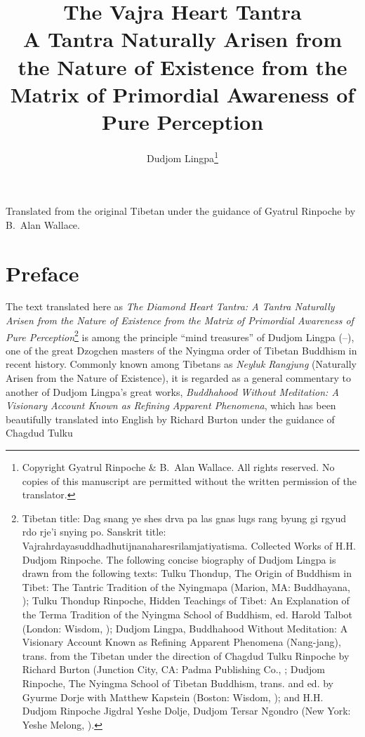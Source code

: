\documentclass[a4paper,11pt,twoside,final]{book}
\title{{\Huge The Vajra Heart Tantra}\\
A Tantra Naturally Arisen from the Nature of Existence
from the Matrix of Primordial Awareness of Pure Perception}
\author{\Large Dudjom Lingpa\footnote{Copyright Gyatrul Rinpoche \&
    B.~Alan Wallace. All rights reserved. No copies of this manuscript
    are permitted without the written permission of the translator.}}
\date{}
\begin{document}
\maketitle

\begin{center}
  Translated from the original Tibetan under the guidance of Gyatrul
  Rinpoche by B.~Alan Wallace.
\end{center}

\chapter{Preface}

The text translated here as \emph{The Diamond Heart Tantra: A Tantra
  Naturally Arisen from the Nature of Existence from the Matrix of
  Primordial Awareness of Pure Perception}\footnote{Tibetan title: Dag
  snang ye shes drva pa las gnas lugs rang byung gi rgyud rdo rje'i
  snying po. Sanskrit title:
  Vajrahrdayasuddhadhutijnanaharesrilamjatiyatisma. Collected Works of
  H.H. Dudjom Rinpoche. The following concise biography of Dudjom
  Lingpa is drawn from the following texts: Tulku Thondup, The Origin
  of Buddhism in Tibet: The Tantric Tradition of the Nyingmapa
  (Marion, MA: Buddhayana, ); Tulku Thondup
  Rinpoche, Hidden Teachings of Tibet: An Explanation of the Terma
  Tradition of the Nyingma School of Buddhism, ed. Harold Talbot
  (London: Wisdom, ); Dudjom Lingpa, Buddhahood
  Without Meditation: A Visionary Account Known as Refining Apparent
  Phenomena (Nang-jang), trans. from the Tibetan under the direction
  of Chagdud Tulku Rinpoche by Richard Burton (Junction City, CA:
  Padma Publishing Co., ; Dudjom Rinpoche, The
  Nyingma School of Tibetan Buddhism, trans. and ed. by Gyurme Dorje
  with Matthew Kapstein (Boston: Wisdom, ); and
  H.H. Dudjom Rinpoche Jigdral Yeshe Dolje, Dudjom Tersar Ngondro (New
  York: Yeshe Melong, ).}  is among the principle
``mind treasures'' of Dudjom Lingpa
(--), one of the great Dzogchen
masters of the Nyingma order of Tibetan Buddhism in recent
history. Commonly known among Tibetans as \emph{Neyluk Rangjung}
(Naturally Arisen from the Nature of Existence), it is regarded as a
general commentary to another of Dudjom Lingpa's great works,
\emph{Buddhahood Without Meditation: A Visionary Account Known as
  Refining Apparent Phenomena}, which has been beautifully translated
into English by Richard Burton under the guidance of Chagdud Tulku
\end{document}
